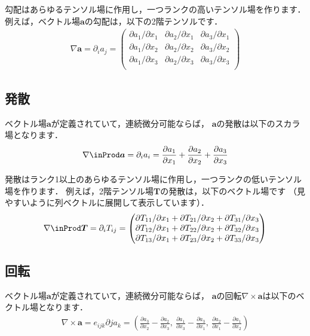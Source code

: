 勾配はあらゆるテンソル場に作用し，一つランクの高いテンソル場を作ります．
例えば，ベクトル場$\bm{a}$の勾配は，以下の2階テンソルです．
\begin{align}
 \label{eq:2.3}
 \nabla\bm{a} = \partial_{i}a_{j} =
 \begin{pmatrix}
  \partial a_{1}/\partial x_{1} & \partial a_{2}/\partial x_{1} & \partial a_{3}/\partial x_{1} \\
  \partial a_{1}/\partial x_{2} & \partial a_{2}/\partial x_{2} & \partial a_{3}/\partial x_{2} \\
  \partial a_{1}/\partial x_{3} & \partial a_{2}/\partial x_{3} & \partial a_{3}/\partial x_{3} \\
 \end{pmatrix}
\end{align}


\subsection{発散}
\label{ssec:2.1.2}
ベクトル場$\bm{a}$が定義されていて，連続微分可能ならば，
$\bm{a}$の発散は以下のスカラ場となります．
\begin{align}
 \label{eq:2.4}
 \nabla \inProd \bm{a} = \partial_{i}a_{i}
 = \frac{\partial a_{1}}{\partial x_{1}}
 + \frac{\partial a_{2}}{\partial x_{2}}
 + \frac{\partial a_{3}}{\partial x_{3}}
\end{align}

発散はランク1以上のあらゆるテンソル場に作用し，一つランクの低いテンソル場を作ります．
例えば，2階テンソル場$\bm{T}$の発散は，以下のベクトル場です
（見やすいように列ベクトルに展開して表示しています）．
\begin{align}
 \label{eq:2.5}
 \nabla \inProd \bm{T} = \partial_{i}T_{ij} =
 \begin{pmatrix}
  \partial T_{11}/\partial x_{1} + \partial T_{21}/\partial x_{2} + \partial T_{31}/\partial x_{3} \\
  \partial T_{12}/\partial x_{1} + \partial T_{22}/\partial x_{2} + \partial T_{32}/\partial x_{3} \\
  \partial T_{13}/\partial x_{1} + \partial T_{23}/\partial x_{2} + \partial T_{33}/\partial x_{3} \\
 \end{pmatrix}
\end{align}


\subsection{回転}
\label{ssec:2.1.3}
ベクトル場$\bm{a}$が定義されていて，連続微分可能ならば，
$\bm{a}$の回転$\nabla \times \bm{a}$は以下のベクトル場となります．
\begin{align}
 \label{eq:2.6}
 \nabla \times \bm{a} = e_{ijk}\partial{j}a_{k}
 = \left(\frac{\partial a_{3}}{\partial x_{2}} - \frac{\partial a_{2}}{\partial x_{3}},\
 \frac{\partial a_{1}}{\partial x_{3}} - \frac{\partial a_{3}}{\partial x_{1}},\
 \frac{\partial a_{2}}{\partial x_{1}} - \frac{\partial a_{1}}{\partial x_{2}}\right)
\end{align}

